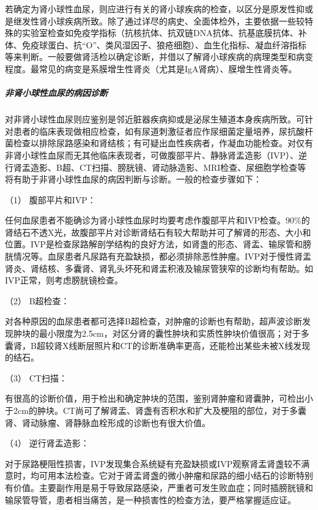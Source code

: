 若确定为肾小球性血尿，则应进行有关的肾小球疾病的检查，以区分是原发性抑或是继发性肾小球疾病所致。除了通过详尽的病史、全面体检外，主要依据一些较特殊的实验室检查如免疫学指标（抗核抗体、抗双链DNA抗体、抗基底膜抗体、补体、免疫球蛋白、抗“O”、类风湿因子、狼疮细胞）、血生化指标、凝血纤溶指标等来判断。一般要做肾活检以确定诊断，并借以了解肾小球疾病的病理类型和病变程度。最常见的病变是系膜增生性肾炎（尤其是IgA肾病）、膜增生性肾炎等。

\subparagraph{非肾小球性血尿的病因诊断}

对非肾小球性血尿则应鉴别是邻近脏器疾病抑或是泌尿生殖道本身疾病所致。可针对患者的临床表现做相应检查，如有尿道刺激征者应作尿细菌定量培养，尿抗酸杆菌检查以排除尿路感染和肾结核；有可疑出血性疾病者，作凝血功能检查。对仅有非肾小球性血尿而无其他临床表现者，可做腹部平片、静脉肾盂造影（IVP）、逆行肾盂造影、B超、CT扫描、膀胱镜、肾动脉造影、MRI检查、尿细胞学检查等将有助于非肾小球性血尿的病因判断与诊断。一般的检查步骤如下：

\hypertarget{text00037.htmlux5cux23CHP1-15-2-4-1-2-1}{}
（1） 腹部平片和IVP：

任何血尿患者不能确诊为肾小球性血尿时均要考虑作腹部平片和IVP检查。90\%的肾结石不透X光，故腹部平片对诊断肾结石有较大帮助并可了解肾的形态、大小和位置。IVP是检查尿路解剖学结构的良好方法，如肾盏的形态、肾盂、输尿管和膀胱情况等。血尿患者凡尿路有充盈缺损，都必须排除恶性肿瘤。IVP对于慢性肾盂肾炎、肾结核、多囊肾、肾乳头坏死和肾盂积液及输尿管狭窄的诊断均有帮助。如IVP正常，则考虑膀胱镜检查。

\hypertarget{text00037.htmlux5cux23CHP1-15-2-4-1-2-2}{}
（2） B超检查：

对各种原因的血尿患者都可选择B超检查，对肿瘤的诊断也有帮助，超声波诊断发现肿块的最小限度为2.5cm，对区分肾的囊性肿块和实质性肿块价值很高；对于多囊肾，B超较肾X线断层照片和CT的诊断准确率更高，还能检出某些未被X线发现的结石。

\hypertarget{text00037.htmlux5cux23CHP1-15-2-4-1-2-3}{}
（3） CT扫描：

有很高的诊断价值，用于检出和确定肿块的范围，鉴别肾肿瘤和肾囊肿，可检出小于2cm的肿块。CT尚可了解肾盂、肾盏有否积水和扩大及梗阻的部位，对于多囊肾、肾动脉瘤、肾静脉血栓形成的诊断也有很大价值。

\hypertarget{text00037.htmlux5cux23CHP1-15-2-4-1-2-4}{}
（4） 逆行肾盂造影：

对于尿路梗阻性损害，IVP发现集合系统疑有充盈缺损或IVP观察肾盂肾盏较不满意时，均可用本法检查。它对于肾盂肾盏的微小肿瘤和尿路的细小结石的诊断特别有价值。主要副作用是易于导致尿路感染，严重者可发生败血症；同时插膀胱镜和输尿管导管，患者相当痛苦，是一种损害性的检查方法，要严格掌握适应证。

